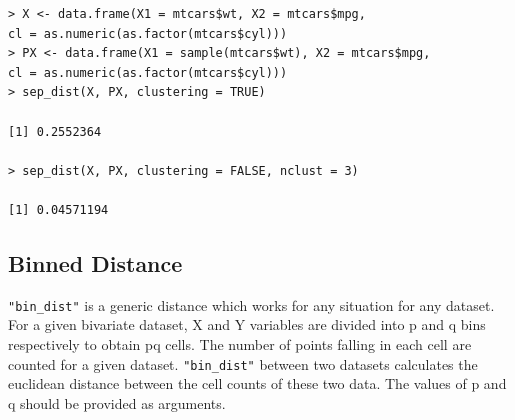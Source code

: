 %

\begin{verbatim}
> X <- data.frame(X1 = mtcars$wt, X2 = mtcars$mpg, 
cl = as.numeric(as.factor(mtcars$cyl)))
> PX <- data.frame(X1 = sample(mtcars$wt), X2 = mtcars$mpg, 
cl = as.numeric(as.factor(mtcars$cyl)))
> sep_dist(X, PX, clustering = TRUE)

[1] 0.2552364

> sep_dist(X, PX, clustering = FALSE, nclust = 3)

[1] 0.04571194
\end{verbatim}

\subsection{Binned Distance}\label{binned-distance}

\texttt{"bin\_dist"} is a generic distance which works for any situation
for any dataset. For a given bivariate dataset, X and Y variables are
divided into p and q bins respectively to obtain pq cells. The number of
points falling in each cell are counted for a given dataset.
\texttt{"bin\_dist"} between two datasets calculates the euclidean
distance between the cell counts of these two data. The values of p and
q should be provided as arguments.

%


